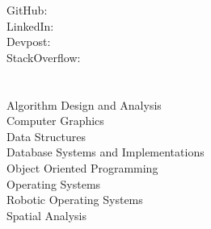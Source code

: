 \documentclass[]{hackathons}
\begin{document}
\begin{minipage}[t]{0.32\textwidth} 


GitHub: \href{https://github.com/adriandarian}{} \\
LinkedIn: \href{https://www.linkedin.com/in/adriandarian}{} \\
Devpost: \href{https://www.devpost.com/adarian}{} \\
StackOverflow: \href{https://stackoverflow.com/users/9647369/adarian}{} \\


\section{}

\small


\section{}
Algorithm Design and Analysis \\
Computer Graphics \\
Data Structures \\
Database Systems and Implementations \\
Object Oriented Programming \\
Operating Systems \\
Robotic Operating Systems \\
Spatial Analysis \\
\small



\end{minipage}
\end{document}
